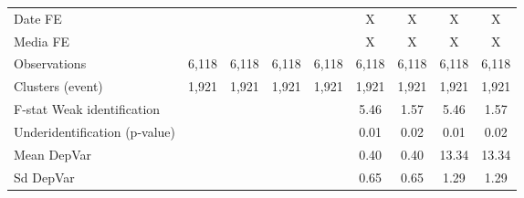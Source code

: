 {\begin{tabular}{l*{8}{c}}
\hline
Date FE             &                     &                     &                     &                     &           X         &           X         &           X         &           X         \\
Media FE            &                     &                     &                     &                     &           X         &           X         &           X         &           X         \\
Observations        &       6,118         &       6,118         &       6,118         &       6,118         &       6,118         &       6,118         &       6,118         &       6,118         \\
Clusters (event)    &       1,921         &       1,921         &       1,921         &       1,921         &       1,921         &       1,921         &       1,921         &       1,921         \\
F-stat Weak identification&                     &                     &                     &                     &        5.46         &        1.57         &        5.46         &        1.57         \\
Underidentification (p-value)&                     &                     &                     &                     &        0.01         &        0.02         &        0.01         &        0.02         \\
Mean DepVar         &                     &                     &                     &                     &        0.40         &        0.40         &       13.34         &       13.34         \\
Sd DepVar           &                     &                     &                     &                     &        0.65         &        0.65         &        1.29         &        1.29         \\
\hline\hline
\end{tabular}
}
